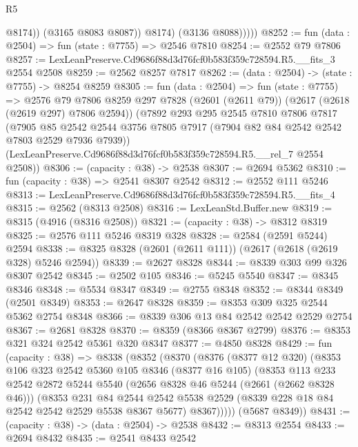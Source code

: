 \begin{lexlean}{R5}
\begin{coremodule}
                    @8174))
                (@3165 @8083 @8087))
              @8174)
            (@3136 @8088)))))
@8252 := fun (data : @2504) => fun (state : @7755) => @2546 @7810
@8254 := @2552 @79 @7806
@8257 := LexLeanPreserve.Cd9686f88d3d76fcf0b583f359c728594.R5.__fits_3 @2554 @2508
@8259 := @2562 @8257 @7817
@8262 := (data : @2504) -> (state : @7755) -> @8254 @8259
@8305 := fun (data : @2504) =>
  fun (state : @7755) =>
  @2576
    @79
    @7806
    @8259
    @297
    @7828
    (@2601 (@2611 @79))
    (@2617 (@2618 (@2619 @297) @7806 @2594))
    (@7892
      @293
      @295
      @2545
      @7810
      @7806
      @7817
      (@7905 @85 @2542 @2544 @3756 @7805 @7917 (@7904 @82 @84 @2542 @2542 @7803 @2529 @7936 @7939))
      (LexLeanPreserve.Cd9686f88d3d76fcf0b583f359c728594.R5.__rel_7 @2554 @2508))
@8306 := (capacity : @38) -> @2538
@8307 := @2694 @5362
@8310 := fun (capacity : @38) => @2541 @8307 @2542
@8312 := @2552 @111 @5246
@8313 := LexLeanPreserve.Cd9686f88d3d76fcf0b583f359c728594.R5.__fits_4
@8315 := @2562 (@8313 @2508)
@8316 := LexLeanStd.Buffer.new
@8319 := @8315 (@4916 (@8316 @2508))
@8321 := (capacity : @38) -> @8312 @8319
@8325 := @2576 @111 @5246 @8319 @328
@8328 := @2584 (@2591 @5244) @2594
@8338 := @8325 @8328 (@2601 (@2611 @111)) (@2617 (@2618 (@2619 @328) @5246 @2594))
@8339 := @2627 @8328
@8344 := @8339 @303 @99 @326 @8307 @2542
@8345 := @2502 @105
@8346 := @5245 @5540
@8347 := @8345 @8346
@8348 := @5534 @8347
@8349 := @2755 @8348
@8352 := @8344 @8349 (@2501 @8349)
@8353 := @2647 @8328
@8359 := @8353 @309 @325 @2544 @5362 @2754 @8348
@8366 := @8339 @306 @13 @84 @2542 @2542 @2529 @2754
@8367 := @2681 @8328
@8370 := @8359 (@8366 @8367 @2799)
@8376 := @8353 @321 @324 @2542 @5361 @320 @8347
@8377 := @4850 @8328
@8429 := fun (capacity : @38) =>
  @8338
    (@8352
      (@8370
        (@8376
          (@8377 @12 @320)
          (@8353
            @106
            @323
            @2542
            @5360
            @105
            @8346
            (@8377 @16 @105)
            (@8353
              @113
              @233
              @2542
              @2872
              @5244
              @5540
              (@2656 @8328 @46 @5244 (@2661 (@2662 @8328 @46)))
              (@8353
                @231
                @84
                @2544
                @2542
                @5538
                @2529
                (@8339 @228 @18 @84 @2542 @2542 @2529 @5538 @8367 @5677)
                @8367)))))
      (@5687 @8349))
@8431 := (capacity : @38) -> (data : @2504) -> @2538
@8432 := @8313 @2554
@8433 := @2694 @8432
@8435 := @2541 @8433 @2542

\end{coremodule}
\end{lexlean}
